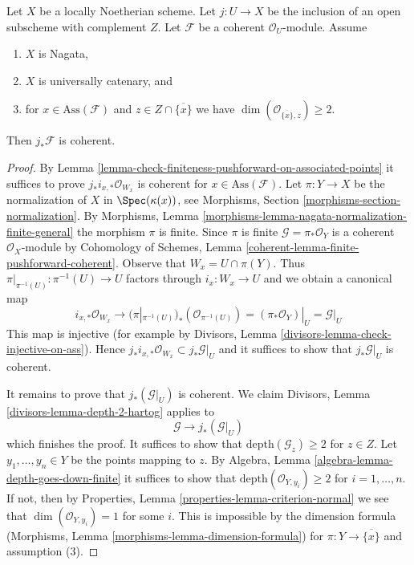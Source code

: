 \begin{lemma}
\label{lemma-finiteness-pushforward}
Let $X$ be a locally Noetherian scheme.
Let $j : U \to X$ be the inclusion of an
open subscheme with complement $Z$. Let $\mathcal{F}$ be a coherent
$\mathcal{O}_U$-module. Assume
\begin{enumerate}
\item $X$ is Nagata,
\item $X$ is universally catenary, and
\item for $x \in \text{Ass}(\mathcal{F})$ and
$z \in Z \cap \overline{\{x\}}$ we have
$\dim(\mathcal{O}_{\overline{\{x\}}, z}) \geq 2$.
\end{enumerate}
Then $j_*\mathcal{F}$ is coherent.
\end{lemma}

\begin{proof}
By Lemma \ref{lemma-check-finiteness-pushforward-on-associated-points}
it suffices to prove $j_*i_{x, *}\mathcal{O}_{W_x}$ is coherent
for $x \in \text{Ass}(\mathcal{F})$.
Let $\pi : Y \to X$ be the normalization of $X$ in $\Spec(\kappa(x))$, see
Morphisms, Section \ref{morphisms-section-normalization}. By
Morphisms, Lemma \ref{morphisms-lemma-nagata-normalization-finite-general}
the morphism $\pi$ is finite. Since $\pi$ is finite
$\mathcal{G} = \pi_*\mathcal{O}_Y$ is a coherent $\mathcal{O}_X$-module by
Cohomology of Schemes, Lemma \ref{coherent-lemma-finite-pushforward-coherent}.
Observe that $W_x = U \cap \pi(Y)$. Thus
$\pi|_{\pi^{-1}(U)} : \pi^{-1}(U) \to U$ factors through $i_x : W_x \to U$
and we obtain a canonical map
$$
i_{x, *}\mathcal{O}_{W_x}
\longrightarrow
(\pi|_{\pi^{-1}(U)})_*(\mathcal{O}_{\pi^{-1}(U)}) =
(\pi_*\mathcal{O}_Y)|_U = \mathcal{G}|_U
$$
This map is injective (for example by Divisors, Lemma
\ref{divisors-lemma-check-injective-on-ass}). Hence
$j_*i_{x, *}\mathcal{O}_{W_x} \subset j_*\mathcal{G}|_U$
and it suffices to show that $j_*\mathcal{G}|_U$ is coherent.

\medskip\noindent
It remains to prove that $j_*(\mathcal{G}|_U)$ is coherent. We claim
Divisors, Lemma \ref{divisors-lemma-depth-2-hartog}
applies to
$$
\mathcal{G} \longrightarrow j_*(\mathcal{G}|_U)
$$
which finishes the proof. It suffices to show that
$\text{depth}(\mathcal{G}_z) \geq 2$ for $z \in Z$.
Let $y_1, \ldots, y_n \in Y$ be the points mapping to $z$.
By Algebra, Lemma \ref{algebra-lemma-depth-goes-down-finite}
it suffices to show that
$\text{depth}(\mathcal{O}_{Y, y_i}) \geq 2$ for $i = 1, \ldots, n$.
If not, then by Properties, Lemma \ref{properties-lemma-criterion-normal}
we see that $\dim(\mathcal{O}_{Y, y_i}) = 1$ for some $i$.
This is impossible by the dimension formula
(Morphisms, Lemma \ref{morphisms-lemma-dimension-formula})
for $\pi : Y \to \overline{\{x\}}$ and assumption (3).
\end{proof}
